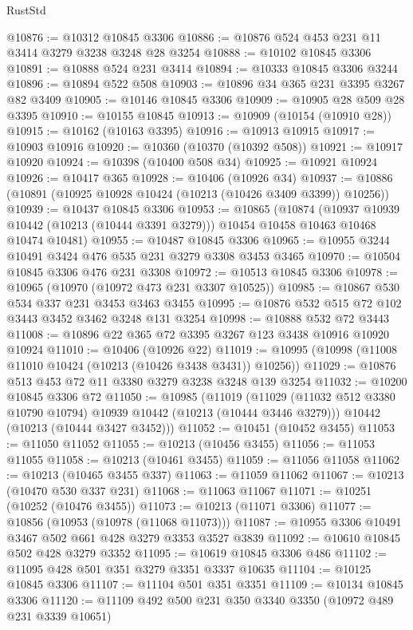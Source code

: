 \begin{lexlean}{RustStd}
\begin{coremodule}
{\begin{coremodule}
{{{{{{{{{{{{{{{{{{{{{{{{{{@10876 := @10312 @10845 @3306
@10886 := @10876 @524 @453 @231 @11 @3414 @3279 @3238 @3248 @28 @3254
@10888 := @10102 @10845 @3306
@10891 := @10888 @524 @231 @3414
@10894 := @10333 @10845 @3306 @3244
@10896 := @10894 @522 @508
@10903 := @10896 @34 @365 @231 @3395 @3267 @82 @3409
@10905 := @10146 @10845 @3306
@10909 := @10905 @28 @509 @28 @3395
@10910 := @10155 @10845
@10913 := @10909 (@10154 (@10910 @28))
@10915 := @10162 (@10163 @3395)
@10916 := @10913 @10915
@10917 := @10903 @10916
@10920 := @10360 (@10370 (@10392 @508))
@10921 := @10917 @10920
@10924 := @10398 (@10400 @508 @34)
@10925 := @10921 @10924
@10926 := @10417 @365
@10928 := @10406 (@10926 @34)
@10937 := @10886 (@10891 (@10925 @10928 @10424 (@10213 (@10426 @3409 @3399)) @10256))
@10939 := @10437 @10845 @3306
@10953 := @10865
    (@10874
      (@10937 @10939 @10442 (@10213 (@10444 @3391 @3279)))
      @10454
      @10458
      @10463
      @10468
      @10474
      @10481)
@10955 := @10487 @10845 @3306
@10965 := @10955 @3244 @10491 @3424 @476 @535 @231 @3279 @3308 @3453 @3465
@10970 := @10504 @10845 @3306 @476 @231 @3308
@10972 := @10513 @10845 @3306
@10978 := @10965 (@10970 (@10972 @473 @231 @3307 @10525))
@10985 := @10867 @530 @534 @337 @231 @3453 @3463 @3455
@10995 := @10876 @532 @515 @72 @102 @3443 @3452 @3462 @3248 @131 @3254
@10998 := @10888 @532 @72 @3443
@11008 := @10896 @22 @365 @72 @3395 @3267 @123 @3438 @10916 @10920 @10924
@11010 := @10406 (@10926 @22)
@11019 := @10995 (@10998 (@11008 @11010 @10424 (@10213 (@10426 @3438 @3431)) @10256))
@11029 := @10876 @513 @453 @72 @11 @3380 @3279 @3238 @3248 @139 @3254
@11032 := @10200 @10845 @3306 @72
@11050 := @10985
    (@11019
      (@11029 (@11032 @512 @3380 @10790 @10794) @10939 @10442 (@10213 (@10444 @3446 @3279)))
      @10442
      (@10213 (@10444 @3427 @3452)))
@11052 := @10451 (@10452 @3455)
@11053 := @11050 @11052
@11055 := @10213 (@10456 @3455)
@11056 := @11053 @11055
@11058 := @10213 (@10461 @3455)
@11059 := @11056 @11058
@11062 := @10213 (@10465 @3455 @337)
@11063 := @11059 @11062
@11067 := @10213 (@10470 @530 @337 @231)
@11068 := @11063 @11067
@11071 := @10251 (@10252 (@10476 @3455))
@11073 := @10213 (@11071 @3306)
@11077 := @10856 (@10953 (@10978 (@11068 @11073)))
@11087 := @10955 @3306 @10491 @3467 @502 @661 @428 @3279 @3353 @3527 @3839
@11092 := @10610 @10845 @502 @428 @3279 @3352
@11095 := @10619 @10845 @3306 @486
@11102 := @11095 @428 @501 @351 @3279 @3351 @3337 @10635
@11104 := @10125 @10845 @3306
@11107 := @11104 @501 @351 @3351
@11109 := @10134 @10845 @3306
@11120 := @11109 @492 @500 @231 @350 @3340 @3350 (@10972 @489 @231 @3339 @10651)
}}}}}}}}}}}}}}}}}}}}}}}}}}
\end{coremodule}}
\end{coremodule}
\end{lexlean}
